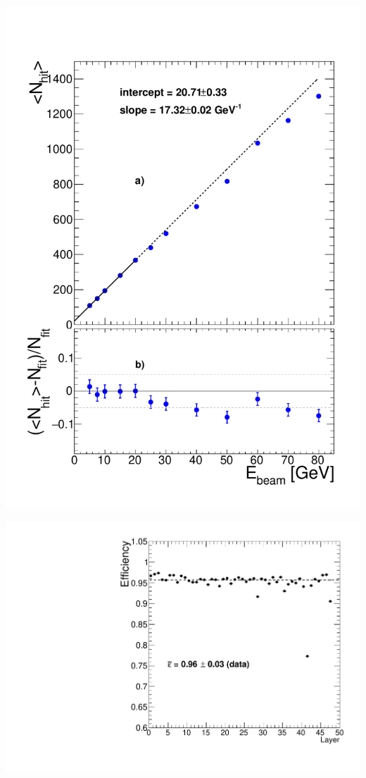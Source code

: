\documentclass[8pt]{beamer}
\begin{document}
  \begin{frame}
  \frametitle{\secname}
  \framesubtitle{\subsecname}
    \begin{minipage}{0.5\linewidth}
      \includegraphics[width=1\linewidth]{figs/NHITPION.pdf}
    \end{minipage} \hfill
    \begin{minipage}{0.48\linewidth}
      \begin{center}
        \includegraphics[width=0.7\linewidth]{figs/eff_2012.pdf} \\

\end{center}
\end{minipage}
\end{frame}
\end{document}
